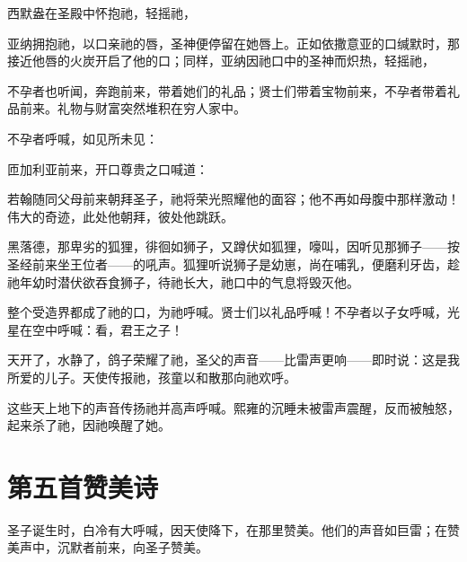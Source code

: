 西默盎在圣殿中怀抱祂，轻摇祂，\par

亚纳拥抱祂，以口亲祂的唇，圣神便停留在她唇上。正如依撒意亚的口缄默时，那接近他唇的火炭开启了他的口；同样，亚纳因祂口中的圣神而炽热，轻摇祂，\par

不孕者也听闻，奔跑前来，带着她们的礼品；贤士们带着宝物前来，不孕者带着礼品前来。礼物与财富突然堆积在穷人家中。\par

不孕者呼喊，如见所未见：\par

匝加利亚前来，开口尊贵之口喊道：\par

若翰随同父母前来朝拜圣子，祂将荣光照耀他的面容；他不再如母腹中那样激动！伟大的奇迹，此处他朝拜，彼处他跳跃。\par

黑落德，那卑劣的狐狸，徘徊如狮子，又蹲伏如狐狸，嚎叫，因听见那狮子——按圣经前来坐王位者——的吼声。狐狸听说狮子是幼崽，尚在哺乳，便磨利牙齿，趁祂年幼时潜伏欲吞食狮子，待祂长大，祂口中的气息将毁灭他。\par

整个受造界都成了祂的口，为祂呼喊。贤士们以礼品呼喊！不孕者以子女呼喊，光星在空中呼喊：看，君王之子！\par

天开了，水静了，鸽子荣耀了祂，圣父的声音——比雷声更响——即时说：这是我所爱的儿子。天使传报祂，孩童以和散那向祂欢呼。\par

这些天上地下的声音传扬祂并高声呼喊。熙雍的沉睡未被雷声震醒，反而被触怒，起来杀了祂，因祂唤醒了她。\par


\section{第五首赞美诗}

圣子诞生时，白冷有大呼喊，因天使降下，在那里赞美。他们的声音如巨雷；在赞美声中，沉默者前来，向圣子赞美。\par


